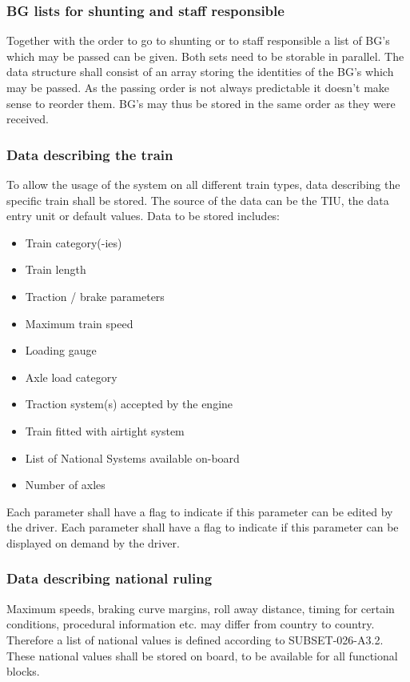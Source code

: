 \subsubsection{BG lists for shunting and staff responsible}
Together with the order to go to shunting or to staff responsible a list of BG's which may be passed can be given. Both sets need to be storable in parallel.
The data structure shall consist of an array storing the identities of the BG's which may be passed. As the passing order is not always predictable it doesn't make sense to reorder them. BG's may thus be stored in the same order as they were received.


\subsubsection{Data describing the train } \label{sss:datadescribingthetrain}
To allow the usage of the system on all different train types, data describing the specific train shall be stored. The source of the data can be the TIU, the data entry unit or default values. Data to be stored includes:
\begin{itemize}
\item Train category(-ies)
\item Train length
\item Traction / brake parameters
\item Maximum train speed
\item Loading gauge
\item Axle load category
\item Traction system(s) accepted by the engine
\item Train fitted with airtight system
\item List of National Systems available on-board
\item Number of axles
\end{itemize}
Each parameter shall have a flag to indicate if this parameter can be edited by the driver.
Each parameter shall have a flag to indicate if this parameter can be displayed on demand by the driver.


\subsubsection{Data describing national ruling}
Maximum speeds, braking curve margins, roll away distance, timing for certain conditions, procedural information etc. may differ from country to country.
Therefore a list of national values is defined according to SUBSET-026-A3.2. These national values shall be stored on board, to be available for all functional blocks. 

